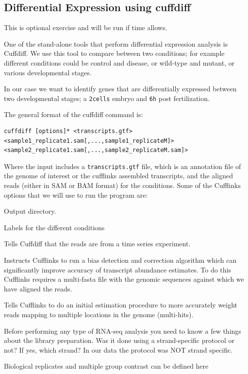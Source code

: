 \begin{bonus}
\section{Differential Expression using cuffdiff}

\begin{warning}
This is optional exercise and will be run if time allows. 	
\end{warning}

One of the stand-alone tools that perform differential expression analysis is
Cuffdiff. We use this tool to compare between two conditions; for example
different conditions could be control and disease, or wild-type and mutant, or
various developmental stages.

In our case we want to identify genes that are differentially expressed between
two developmental stages; a \texttt{2cells} embryo and \texttt{6h} post
fertilization.

\begin{information}
The general format of the cuffdiff command is:

\begin{lstlisting}[style=command_syntax]
cuffdiff [options]* <transcripts.gtf> <sample1_replicate1.sam[,...,sample1_replicateM]> <sample2_replicate1.sam[,...,sample2_replicateM.sam]>
\end{lstlisting}

Where the input includes a \texttt{transcripts.gtf} file, which is an annotation
file of the genome of interest or the cufflinks assembled transcripts, and the aligned reads (either in SAM or BAM
format) for the conditions.
Some of the Cufflinks options that we will use to run the program are:

\begin{description}[style=multiline,labelindent=0cm,align=right,leftmargin=\descriptionlabelspace,rightmargin=1.5cm,font=\ttfamily]
  \item[-o] Output directory.
  \item[-L] Labels for the different conditions
  \item[-T] Tells Cuffdiff that the reads are from a time series experiment.
  \item[-b] Instructs Cufflinks to run a bias detection and correction algorithm
  which can significantly improve accuracy of transcript abundance estimates.
  To do this Cufflinks requires a multi-fasta file with the genomic sequences
  against which we have aligned the reads.
  \item[-u] Tells Cufflinks to do an initial estimation procedure to more
  accurately weight reads mapping to multiple locations in the genome
  (multi-hits). 
  \item[--library-type] Before performing any type of RNA-seq analysis you need
 to know a few things about the library preparation. Was it done using a
 strand-specific protocol or not? If yes, which strand? In our data the protocol
 was NOT strand specific.
  \item[-C] Biological replicates and multiple group contrast can be defined here 
\end{description}
\end{information}


\end{bonus}
